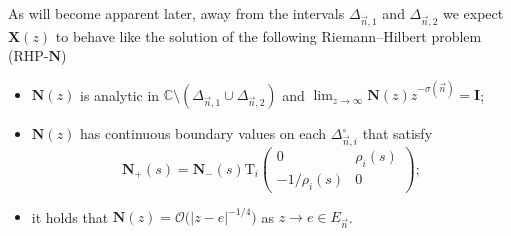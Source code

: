 \documentclass[10pt,a4paper]{amsart}
\numberwithin{equation}{section}
\newcommand{\C}		{\mathbb{C}}
\newcommand{\n}{{\vec n}}
\newcommand{\rhn} {\textnormal{RHP}-${\boldsymbol N}$}
\begin{document}
As will become apparent later, away from the intervals $ \Delta_{\n,1} $ and $ \Delta_{\n,2} $ we expect $ \boldsymbol X(z) $ to behave like the solution of the following Riemann--Hilbert problem (\rhn)
\begin{itemize}\itemsep=0pt
\label{rhn}
\item[(a)] $\boldsymbol N(z)$ is analytic in $\C\setminus(\Delta_{\n,1}\cup \Delta_{\n,2})$ and $ \lim_{z\to\infty} {\boldsymbol N}(z)z^{-\sigma(\n)} = {\boldsymbol I}$;
\item[(b)] $\boldsymbol N(z)$ has continuous boundary values on each $\Delta_{\n,i}^\circ$ that satisfy
\[
\boldsymbol N_+(s) = \boldsymbol N_-(s) \mathrm{T}_i \begin{pmatrix} 0 & \rho_i(s) \\ -1/\rho_i(s) & 0 \end{pmatrix};
\]
\item[(c)] it holds that $ \boldsymbol N(z) = \boldsymbol{\mathcal O}\bigl(|z-e|^{-1/4}\bigr) $ as $ z\to e \in E_\n $.
\end{itemize}
\end{document}
